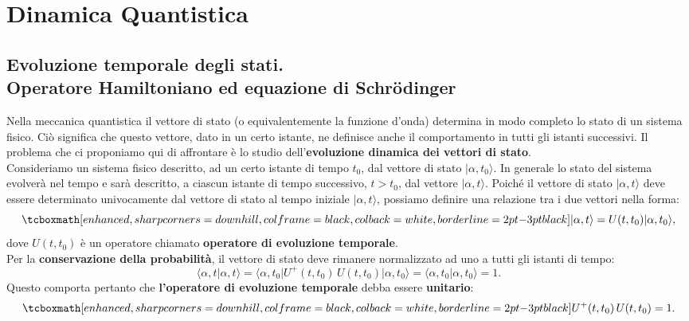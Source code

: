 \chapter{Dinamica Quantistica}
\section[Evoluzione temporale degli stati]{Evoluzione temporale degli stati.\\Operatore Hamiltoniano ed equazione di Schr\"{o}dinger}
Nella meccanica quantistica il vettore di stato (o equivalentemente la funzione d'onda) determina in modo completo lo stato di un sistema fisico. Ciò significa che questo vettore, dato in un certo istante, ne definisce anche il comportamento in tutti gli istanti successivi. Il problema che ci proponiamo qui di affrontare è lo studio dell'\textbf{evoluzione dinamica dei vettori di stato}.\\

Consideriamo un sistema fisico descritto, ad un certo istante di tempo $t_0$, dal vettore di stato $\vert \alpha, t_0 \rangle$. In generale lo stato del sistema evolverà nel tempo e sarà descritto, a ciascun istante di tempo successivo, $t>t_0$, dal vettore $\vert \alpha, t\rangle$. Poiché il vettore di stato $\vert \alpha, t \rangle$ deve essere determinato univocamente dal vettore di stato al tempo iniziale $\vert \alpha, t \rangle$, possiamo definire una relazione tra i due vettori nella forma:
	\begin{equation}
		\tcboxmath[enhanced, sharp corners=downhill, colframe=black, colback=white, borderline={2pt}{-3pt}{black}]{	
			\vert \alpha, t \rangle = U(t,t_0)\vert \alpha, t_0 \rangle,
			}
	\end{equation}
dove $U(t,t_0)$ è un operatore chiamato \textbf{operatore di evoluzione temporale}.\\

Per la \textbf{conservazione della probabilità}, il vettore di stato deve rimanere normalizzato ad uno a tutti gli istanti di tempo:
	\begin{equation}
		\langle \alpha, t \vert \alpha, t \rangle =
\langle \alpha, t_0 \vert U^+ (t,t_0)\, U(t,t_0)\vert \alpha, t_0 \rangle =  \langle \alpha, t_0 \vert \alpha, t_0 \rangle =1.
	\end{equation}
Questo comporta pertanto che  \textbf{l'operatore di evoluzione temporale} debba essere \textbf{unitario}:
	\begin{equation}
		\tcboxmath[enhanced, sharp corners=downhill, colframe=black, colback=white, borderline={2pt}{-3pt}{black}]{
			U^+ (t,t_0)\, U(t,t_0)=1.
			}
	\end{equation}\\
	

